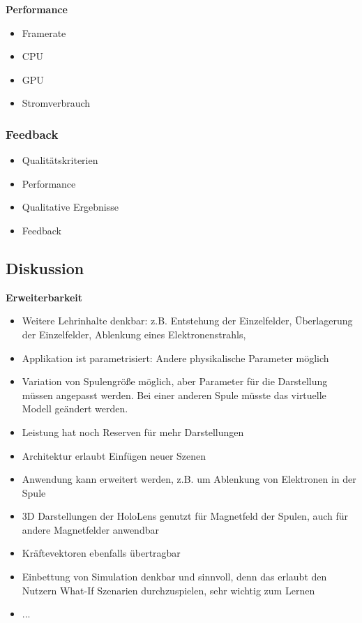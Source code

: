 \textbf{Performance}
\begin{itemize}
	\item Framerate
	\item CPU
	\item GPU
	\item Stromverbrauch
\end{itemize}


\subsubsection{Feedback}
\begin{itemize}
	\item Qualitätskriterien
	\item Performance
	\item Qualitative Ergebnisse
	\item Feedback
\end{itemize}


\subsection{Diskussion}
\textbf{Erweiterbarkeit}
\begin{itemize}
	\item Weitere Lehrinhalte denkbar: z.B. Entstehung der Einzelfelder, Überlagerung der Einzelfelder, Ablenkung eines Elektronenstrahls, 
	\item Applikation ist parametrisiert: Andere physikalische Parameter möglich
	\item Variation von Spulengröße möglich, aber Parameter für die Darstellung müssen angepasst werden. Bei einer anderen Spule müsste das virtuelle Modell geändert werden.
	\item Leistung hat noch Reserven für mehr Darstellungen
	\item Architektur erlaubt Einfügen neuer Szenen
\end{itemize}
\begin{itemize}
	\item Anwendung kann erweitert werden, z.B. um Ablenkung von Elektronen in der Spule
	\item 3D Darstellungen der HoloLens genutzt für Magnetfeld der Spulen, auch für andere Magnetfelder anwendbar
	\item Kräftevektoren ebenfalls übertragbar
	\item Einbettung von Simulation denkbar und sinnvoll, denn das erlaubt den Nutzern What-If Szenarien durchzuspielen, sehr wichtig zum Lernen
	\item ...
\end{itemize}
	
	
	
	
	
	
	
	
	
	
	
	
	
	
	